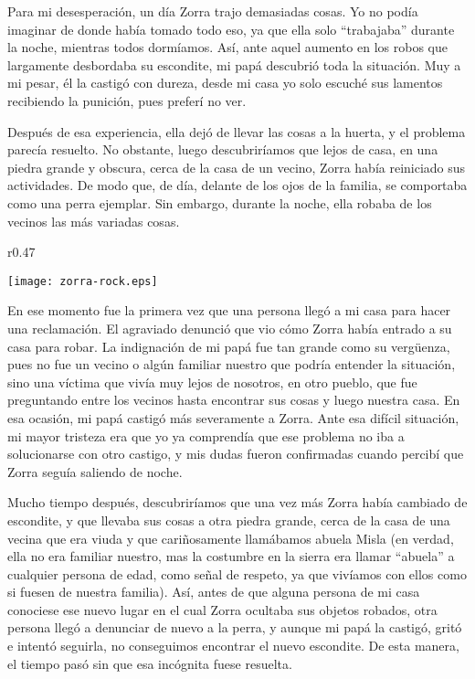 Para mi desesperación, un día Zorra trajo demasiadas cosas. Yo no podía imaginar de donde había tomado todo eso, ya que ella solo ``trabajaba'' durante la noche, mientras todos dormíamos. Así, ante aquel aumento en los robos que largamente desbordaba su escondite, mi papá descubrió toda la situación.
Muy a mi pesar, él la castigó con dureza, desde mi casa yo solo escuché sus lamentos recibiendo la punición, pues preferí no ver.


Después de esa experiencia, ella dejó de llevar las cosas a la huerta, y el problema parecía resuelto. No obstante, luego descubriríamos que lejos de casa, en una piedra grande y obscura, cerca de la casa de un vecino, 
Zorra había reiniciado sus actividades. De modo que, de día, delante de los ojos de la familia, se comportaba como una perra ejemplar. Sin embargo, durante la noche, ella robaba de los vecinos las más variadas cosas.

\ifdefined\EnableIncludeImages
\begin{wrapfigure}{r}{0.47\textwidth}
  \begin{center}
    \texttt{[image: zorra-rock.eps]}
  \end{center}
  \vspace{-10pt}
\end{wrapfigure}
\fi
En ese momento fue la primera vez que una persona llegó a mi casa para hacer una reclamación. El agraviado denunció que vio cómo Zorra había entrado a su casa para robar.
La indignación de mi papá fue tan grande como su vergüenza, pues no fue un vecino o algún familiar nuestro que podría entender la situación, sino una víctima que vivía muy lejos de nosotros, en otro pueblo, que fue preguntando entre los vecinos hasta encontrar sus cosas y luego nuestra casa.
En esa ocasión, mi papá castigó más severamente a Zorra. Ante esa difícil situación, mi mayor tristeza era que yo ya comprendía que ese problema no iba a solucionarse con otro castigo, y mis dudas fueron confirmadas cuando percibí que Zorra seguía saliendo de noche.

Mucho tiempo después, descubriríamos que una vez más Zorra había cambiado de escondite, y que llevaba sus cosas a otra piedra grande, cerca de la casa de una vecina que era viuda y que cariñosamente llamábamos abuela Misla (en verdad, ella no era familiar nuestro, mas la costumbre en la sierra era llamar ``abuela'' a cualquier persona de edad, como señal de respeto, ya que vivíamos con ellos como si fuesen de nuestra familia).
Así, antes de que alguna persona de mi casa conociese ese nuevo lugar en el cual Zorra ocultaba sus objetos robados, otra persona llegó a denunciar de nuevo a la perra, y aunque mi papá la castigó, gritó e intentó seguirla, no conseguimos encontrar el nuevo escondite. De esta manera, el tiempo pasó sin que esa incógnita fuese resuelta.

